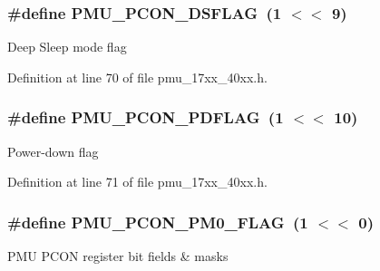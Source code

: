\subsubsection[{\texorpdfstring{P\+M\+U\+\_\+\+P\+C\+O\+N\+\_\+\+D\+S\+F\+L\+AG}{PMU_PCON_DSFLAG}}]{\setlength{\rightskip}{0pt plus 5cm}\#define P\+M\+U\+\_\+\+P\+C\+O\+N\+\_\+\+D\+S\+F\+L\+AG~(1 $<$$<$ 9)}\hypertarget{group__PMU__17XX__40XX_ga35db160b23010e0f598641f1f40ebd15}{}\label{group__PMU__17XX__40XX_ga35db160b23010e0f598641f1f40ebd15}
Deep Sleep mode flag 

Definition at line 70 of file pmu\+\_\+17xx\+\_\+40xx.\+h.

\subsubsection[{\texorpdfstring{P\+M\+U\+\_\+\+P\+C\+O\+N\+\_\+\+P\+D\+F\+L\+AG}{PMU_PCON_PDFLAG}}]{\setlength{\rightskip}{0pt plus 5cm}\#define P\+M\+U\+\_\+\+P\+C\+O\+N\+\_\+\+P\+D\+F\+L\+AG~(1 $<$$<$ 10)}\hypertarget{group__PMU__17XX__40XX_gabad3cddc54f9c1cdd8128ec65fc50691}{}\label{group__PMU__17XX__40XX_gabad3cddc54f9c1cdd8128ec65fc50691}
Power-\/down flag 

Definition at line 71 of file pmu\+\_\+17xx\+\_\+40xx.\+h.

\subsubsection[{\texorpdfstring{P\+M\+U\+\_\+\+P\+C\+O\+N\+\_\+\+P\+M0\+\_\+\+F\+L\+AG}{PMU_PCON_PM0_FLAG}}]{\setlength{\rightskip}{0pt plus 5cm}\#define P\+M\+U\+\_\+\+P\+C\+O\+N\+\_\+\+P\+M0\+\_\+\+F\+L\+AG~(1 $<$$<$ 0)}\hypertarget{group__PMU__17XX__40XX_ga68db97d4dfb92acf82b041ddbbfa692d}{}\label{group__PMU__17XX__40XX_ga68db97d4dfb92acf82b041ddbbfa692d}
P\+MU P\+C\+ON register bit fields \& masks 

